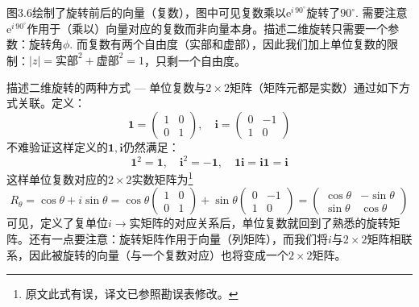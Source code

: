 图3.6绘制了旋转前后的向量（复数），图中可见复数乘以$\mathrm{e}^{i\, 90^\circ}$旋转了$90^\circ$.
需要注意$\mathrm{e}^{i\, 90^\circ}$作用于（乘以）向量对应的复数而非向量本身。描述二维旋转只需要一个参数：旋转角$\phi$. 而复数有两个自由度（实部和虚部），因此我们加上单位复数的限制：$|z| = \text{实部}^2 + \text{虚部}^2 = 1$，只剩一个自由度。

描述二维旋转的两种方式 --- 单位复数与$2 \times 2$矩阵（矩阵元都是实数）通过如下方式关联。定义：
\begin{equation}
\label{equ3.15}
\mathbf{1} = 
	\begin{pmatrix}
		1 & 0 \\ 0 & 1
	\end{pmatrix}
,\quad
\mathbf{i} = 
	\begin{pmatrix}
		0 & -1 \\ 1 & 0
	\end{pmatrix}
\end{equation}
不难验证这样定义的$\mathbf{1, i}$仍然满足：
\begin{equation}
\mathbf{1}^2 = \mathbf{1},\quad \mathbf{i}^2 = -\mathbf{1},\quad \mathbf{1i} = \mathbf{i1} = \mathbf{i}
\end{equation}
这样单位复数对应的$2 \times 2$实数矩阵为\footnote{原文此式有误，译文已参照勘误表修改。}
\begin{equation}
\label{equ3.17}
R_\theta = \cos \theta + i\sin\theta = \cos \theta 
\begin{pmatrix}
	1 & 0 \\ 0 & 1
\end{pmatrix}
+ \sin \theta
\begin{pmatrix}
	0 & -1 \\ 1 & 0
\end{pmatrix}
=
\begin{pmatrix}
	\cos \theta & -\sin \theta \\
	\sin \theta & \cos \theta
\end{pmatrix}
\end{equation}
可见，定义了复单位$i \rightarrow \text{实矩阵}$的对应关系后，单位复数就回到了熟悉的旋转矩阵。还有一点要注意：旋转矩阵作用于向量（列矩阵），而我们将$i$与$2 \times 2$矩阵相联系，因此被旋转的向量（与一个复数对应）也将变成一个$2 \times 2$矩阵。

